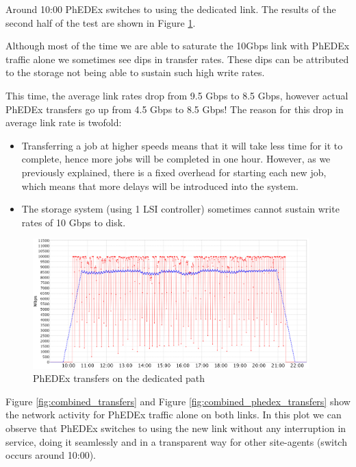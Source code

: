 Around 10:00 PhEDEx switches to using the dedicated link. The results of the 
second half of the test are shown in Figure \ref{fig:solo_transfers}.

Although most of the time we are able to saturate the 10Gbps link with PhEDEx 
traffic alone we sometimes see dips in transfer rates. These dips can be attributed 
to the storage not being able to sustain such high write rates.

This time, the average link rates drop from 9.5 Gbps to 8.5 Gbps, however 
actual PhEDEx transfers go up from 4.5 Gbps to 8.5 Gbps! The reason for this 
drop in average link rate is twofold: 

\begin{itemize}
  \item Transferring a job at higher speeds means that it will take less time for
  it to complete, hence more jobs will be completed in one hour. However, as
  we previously explained, there is a fixed overhead for starting each new job, which
  means that more delays will be introduced into the system.
  \item The storage system (using 1 LSI controller) sometimes cannot sustain
  write rates of 10 Gbps to disk.
\end{itemize}

\begin{figure}[h]
  \centering
  \includegraphics[width=0.95\textwidth]{Figures/FileDownload_Solo_path.png}
  \caption{PhEDEx transfers on the dedicated path}
    \label{fig:solo_transfers}
\end{figure} 

Figure \ref{fig:combined_transfers} and Figure \ref{fig:combined_phedex_transfers} show
the  network activity for PhEDEx traffic alone on both links. 
In this plot we can observe that PhEDEx switches to using the
new link without any interruption in service, doing it seamlessly and in a 
transparent way for other site-agents (switch occurs around 10:00).

